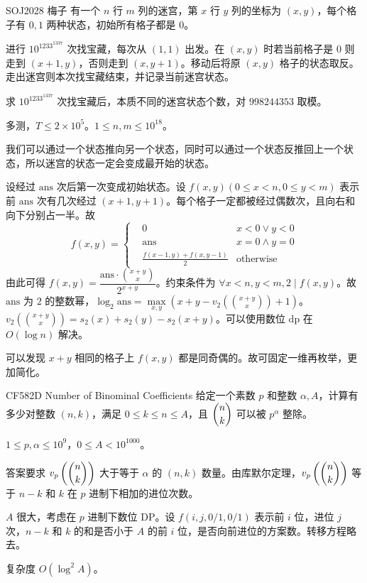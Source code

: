 \documentclass [hyperref={bookmarksdepth=4}, aspectratio=169] {beamer}
\theoremstyle {fy}
\begin{document}
\begin{frame}{SOJ2028 梅子}
有一个 $n$ 行 $m$ 列的迷宫，第 $x$ 行 $y$ 列的坐标为 $(x,y)$，每个格子有 $0,1$ 两种状态，初始所有格子都是 $0$。

进行 $10^{1233^{1337}}$ 次找宝藏，每次从 $(1,1)$ 出发。在 $(x,y)$ 时若当前格子是 $0$ 则走到 $(x+1,y)$，否则走到 $(x,y+1)$。移动后将原 $(x,y)$ 格子的状态取反。走出迷宫则本次找宝藏结束，并记录当前迷宫状态。

求 $10^{1233^{1337}}$ 次找宝藏后，本质不同的迷宫状态个数，对 $998244353$ 取模。

多测，$T\le2\times10^5$。$1\le n,m\le 10^{18}$。

我们可以通过一个状态推向另一个状态，同时可以通过一个状态反推回上一个状态，所以迷宫的状态一定会变成最开始的状态。

设经过 $\text{ans}$ 次后第一次变成初始状态。设 $f(x,y)(0\le x<n,0\le y<m)$ 表示前 $\text{ans}$ 次有几次经过 $(x+1,y+1)$。每个格子一定都被经过偶数次，且向右和向下分别占一半。故
$$
f(x,y)=
\left\{
\begin{aligned}
&0 &x<0\vee y<0\\
&\text{ans} &x=0\wedge y=0\\
&\frac{f(x-1,y)+f(x,y-1)}{2} &\text{otherwise}
\end{aligned}
\right.
$$
由此可得 $f(x,y)=\dfrac{\text{ans}\cdot \binom{x+y}{x}}{2^{x+y}}$。约束条件为 $\forall x<n,y<m,2\mid f(x,y)$。故 $\text{ans}$ 为 $2$ 的整数幂，$\log_2\text{ans}=\max\limits_{x,y}(x+y-v_2\left(\binom{x+y}{x} \right)+1)$。$v_2\left(\binom{x+y}{x} \right)=s_2(x)+s_2(y)-s_2(x+y)$。可以使用数位 $\text{dp}$ 在 $O(\log n)$ 解决。

可以发现 $x+y$ 相同的格子上 $f(x,y)$ 都是同奇偶的。故可固定一维再枚举，更加简化。
\end{frame}

\begin{frame}{CF582D Number of Binominal Coefficients}
给定一个素数 $p$ 和整数 $\alpha,A$，计算有多少对整数 $(n,k)$，满足 $0\le k\le n\le A$，且 $\dbinom{n}{k}$ 可以被 $p^{\alpha}$ 整除。

$1\le p,\alpha\le 10^9$，$0\le A<10^{1000}$。

答案要求 $v_p\left(\dbinom{n}{k} \right)$ 大于等于 $\alpha$ 的 $(n,k)$ 数量。由库默尔定理，$v_p\left(\dbinom{n}{k}\right)$ 等于 $n-k$ 和 $k$ 在 $p$ 进制下相加的进位次数。

$A$ 很大，考虑在 $p$ 进制下数位 DP。设 $f(i,j,0/1,0/1)$ 表示前 $i$ 位，进位 $j$ 次，$n-k$ 和 $k$ 的和是否小于 $A$ 的前 $i$ 位，是否向前进位的方案数。转移方程略去。

复杂度 $O(\log^2 A)$。
\end{frame}
\end{document}
